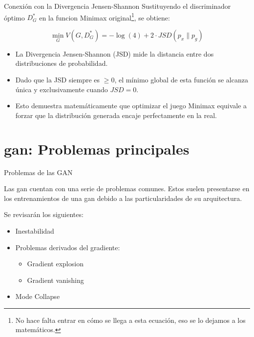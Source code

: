 \begin{frame}{Conexión con la Divergencia Jensen-Shannon}
Sustituyendo el discriminador óptimo $D^*_G$ en la funcion Minimax original\footnote{No hace falta entrar en cómo se llega a esta ecuación, eso se lo dejamos a los matemáticos.}, se obtiene:

\begin{equation}
    \min_G V(G, D^*_G) = -\log(4) + 2 \cdot JSD(p_{x} \parallel p_g)
\end{equation}

\begin{itemize}
    \item La \alert{Divergencia Jensen-Shannon (JSD)} mide la distancia entre dos distribuciones de probabilidad.
    \item Dado que la JSD siempre es $\ge 0$, el mínimo global de esta función se alcanza única y exclusivamente cuando \alert{$JSD = 0$}.
    \item Esto demuestra \alert{matemáticamente} que optimizar el juego Minimax equivale a forzar que la distribución generada encaje perfectamente en la real.
\end{itemize}
\end{frame}

\section{\gls{gan}: Problemas principales}

\begin{frame}{Problemas de las GAN}

    Las \gls{gan} cuentan con una serie de \alert{problemas comunes}. Estos suelen presentarse en los entrenamientos de una \gls{gan} debido a las particularidades de su \alert{arquitectura}.
    
    Se revisarán los siguientes:
    \begin{itemize}
        \item Inestabilidad
        \item Problemas derivados del gradiente:
        \begin{itemize}
            \item Gradient explosion
            \item Gradient vanishing
        \end{itemize}
        \item Mode Collapse
    \end{itemize}
    
\end{frame}


